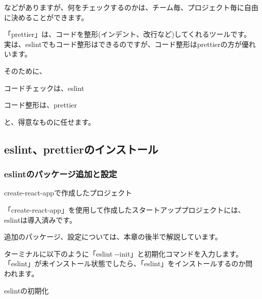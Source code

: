 などがありますが、何をチェックするのかは、チーム毎、プロジェクト毎に自由に決めることができます。

\vspace*{\baselineskip}

「prettier」は、コードを整形(インデント、改行など)してくれるツールです。
実は、eslintでもコード整形はできるのですが、コード整形はprettierの方が優れいます。

\vspace*{\baselineskip}

そのために、

\begin{starteritemize}
\item コードチェックは、eslint
\item コード整形は、prettier
\end{starteritemize}

と、得意なものに任せます。

\subsection{eslint、prettierのインストール}
\keeplastskip{
  \label{sec:2-3-1}
  \label{sec-03eslint}
  \par\nobreak
}

\subsubsection*{eslintのパッケージ追加と設定}
\keeplastskip{
  \label{sec:2-3-1-1}
  \label{sec-03eslint-install}
  \par\nobreak
}
\begin{starternote}[]{create{-}react{-}appで作成したプロジェクト}

「create{-}react{-}app」を使用して作成したスタートアッププロジェクトには、eslintは導入済みです。

\vspace*{\baselineskip}

追加のパッケージ、設定については、本章の後半で解説しています。

\end{starternote}

ターミナルに以下のように「eslint {-}{-}init」と初期化コマンドを入力します。
「eslint」が未インストール状態でしたら、「eslint」をインストールするのか問われます。

\def\startercodeblockfontsize{}
\begin{starterterminal}[]{eslintの初期化}\end{starterterminal}

